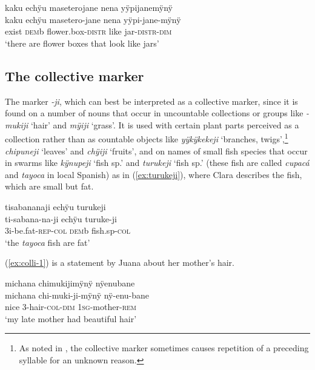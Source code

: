 \ea\label{ex:distri-2}
\begingl
\glpreamble kaku echÿu maseterojane nena yÿpijanemÿnÿ\\
\gla kaku echÿu masetero-jane nena yÿpi-jane-mÿnÿ\\
\glb exist \textsc{dem}b flower.box-\textsc{distr} like jar-\textsc{distr}-\textsc{dim}\\
\glft ‘there are flower boxes that look like jars'
\endgl
\trailingcitation{[jxx-p120430l-2.616]}
\xe
{}

\subsection{The collective marker}\label{sec:Collective}
The marker \textit{-ji}, which can best be interpreted as a collective marker, since it is found on a number of nouns that occur in uncountable collections or groups like \textit{-mukiji} ‘hair’ and  \textit{mÿiji} ‘grass’. It is used with certain plant parts perceived as a collection rather than as countable objects like \textit{yÿkÿkekeji} ‘branches, twigs’,\footnote{As noted in , the collective marker sometimes causes repetition of a preceding syllable for an unknown reason.} \textit{chipuneji} ‘leaves’ and \textit{chÿiji} ‘fruits’, and on names of small fish species that occur in swarms like \textit{kÿnupeji} ‘fish sp.’ and \textit{turukeji} ‘fish sp.’ (these fish are called \textit{cupacá} and \textit{tayoca} in local Spanish) as in (\ref{ex:turukeji}), where Clara describes the fish, which are small but fat.

\ea\label{ex:turukeji}
\begingl 
\glpreamble tisabananaji echÿu turukeji\\
\gla ti-sabana-na-ji echÿu turuke-ji\\ 
\glb 3i-be.fat-\textsc{rep}-\textsc{col} \textsc{dem}b fish.sp-\textsc{col}\\ 
\glft ‘the \textit{tayoca} fish are fat’
\trailingcitation{[cux-c120414ls-2.152]}
\xe

(\ref{ex:colli-1}) is a statement by Juana about her mother’s hair.

\ea\label{ex:colli-1}
\begingl
\glpreamble michana chimukijimÿnÿ nÿenubane\\
\gla michana chi-muki-ji-mÿnÿ nÿ-enu-bane\\
\glb nice 3-hair-\textsc{col}-\textsc{dim} 1\textsc{sg}-mother-\textsc{rem}\\
\glft ‘my late mother had beautiful hair’
\endgl
\trailingcitation{[jxx-d181102l.47]}
\xe


